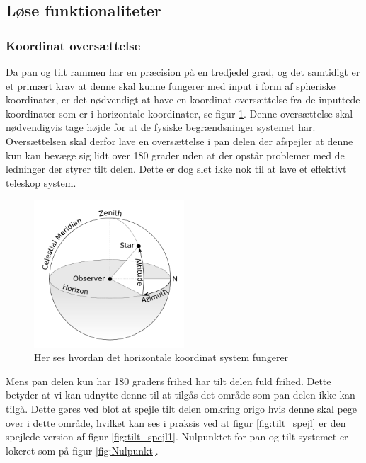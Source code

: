 \subsection{Løse funktionaliteter}

\subsubsection{Koordinat oversættelse}

Da pan og tilt rammen har en præcision på en tredjedel grad, og det samtidigt er et primært krav at denne skal kunne fungerer med input i form af spheriske koordinater, er det nødvendigt at have en koordinat oversættelse fra de inputtede koordinater som er i horizontale koordinater, se figur \ref{fig:Horizontal}. Denne oversættelse skal nødvendigvis tage højde for at de fysiske begrændsninger systemet har. Oversættelsen skal derfor lave en oversættelse i pan delen der afspejler at denne kun kan bevæge sig lidt over 180 grader uden at der opstår problemer med de ledninger der styrer tilt delen. Dette er dog slet ikke nok til at lave et effektivt teleskop system.
\begin{figure}[!h]
	\begin{center}
		\includegraphics[width=0.5\textwidth]{Billeder/Horizontal.png}
	\end{center}		
	\caption{Her ses hvordan det horizontale koordinat system fungerer}
	\label{fig:Horizontal}
\end{figure}

Mens pan delen kun har 180 graders frihed har tilt delen fuld frihed. Dette betyder at vi kan udnytte denne til at tilgås det område som pan delen ikke kan tilgå. Dette gøres ved blot at spejle tilt delen omkring origo hvis denne skal pege over i dette område, hvilket kan ses i praksis ved at figur \ref{fig:tilt_spejl} er den spejlede version af figur \ref{fig:tilt_spejl1}. Nulpunktet for pan og tilt systemet er lokeret som på figur \ref{fig:Nulpunkt}. 

